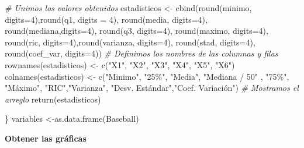 \documentclass{staprojteamusb}
\newenvironment{Shaded}{\begin{snugshade}}{\end{snugshade}}
\newcommand{\AttributeTok}[1]{\textcolor[rgb]{0.77,0.63,0.00}{#1}}
\newcommand{\CommentTok}[1]{\textcolor[rgb]{0.56,0.35,0.01}{\textit{#1}}}
\newcommand{\DecValTok}[1]{\textcolor[rgb]{0.00,0.00,0.81}{#1}}
\newcommand{\FunctionTok}[1]{\textcolor[rgb]{0.00,0.00,0.00}{#1}}
\newcommand{\NormalTok}[1]{#1}
\newcommand{\OtherTok}[1]{\textcolor[rgb]{0.56,0.35,0.01}{#1}}
\newcommand{\StringTok}[1]{\textcolor[rgb]{0.31,0.60,0.02}{#1}}
\begin{document}
\begin{Shaded}
\begin{Highlighting}[]
  \CommentTok{\# Unimos los valores obtenidos}
\NormalTok{  estadisticos }\OtherTok{\textless{}{-}} \FunctionTok{cbind}\NormalTok{(}\FunctionTok{round}\NormalTok{(minimo, }\AttributeTok{digits=}\DecValTok{4}\NormalTok{),}\FunctionTok{round}\NormalTok{(q1, }\AttributeTok{digits =} \DecValTok{4}\NormalTok{),}
                        \FunctionTok{round}\NormalTok{(media, }\AttributeTok{digits=}\DecValTok{4}\NormalTok{), }\FunctionTok{round}\NormalTok{(mediana,}\AttributeTok{digits=}\DecValTok{4}\NormalTok{),}
                        \FunctionTok{round}\NormalTok{(q3, }\AttributeTok{digits=}\DecValTok{4}\NormalTok{), }\FunctionTok{round}\NormalTok{(maximo, }\AttributeTok{digits=}\DecValTok{4}\NormalTok{),}
                        \FunctionTok{round}\NormalTok{(ric, }\AttributeTok{digits=}\DecValTok{4}\NormalTok{),}\FunctionTok{round}\NormalTok{(varianza, }\AttributeTok{digits=}\DecValTok{4}\NormalTok{), }
                        \FunctionTok{round}\NormalTok{(stad, }\AttributeTok{digits=}\DecValTok{4}\NormalTok{), }\FunctionTok{round}\NormalTok{(coef\_var, }\AttributeTok{digits=}\DecValTok{4}\NormalTok{))}
  \CommentTok{\# Definimos los nombres de las columnas y filas}
  \FunctionTok{rownames}\NormalTok{(estadisticos) }\OtherTok{\textless{}{-}} \FunctionTok{c}\NormalTok{(}\StringTok{"X1"}\NormalTok{, }\StringTok{"X2"}\NormalTok{, }\StringTok{"X3"}\NormalTok{, }\StringTok{"X4"}\NormalTok{, }\StringTok{"X5"}\NormalTok{, }\StringTok{"X6"}\NormalTok{) }
  \FunctionTok{colnames}\NormalTok{(estadisticos) }\OtherTok{\textless{}{-}} \FunctionTok{c}\NormalTok{(}\StringTok{"Minimo"}\NormalTok{, }\StringTok{"25\%"}\NormalTok{, }\StringTok{"Media"}\NormalTok{, }\StringTok{"Mediana / 50"}\NormalTok{ ,}
                              \StringTok{"75\%"}\NormalTok{, }\StringTok{"Máximo"}\NormalTok{, }\StringTok{"RIC"}\NormalTok{,}\StringTok{"Varianza"}\NormalTok{, }
                              \StringTok{"Desv. Estándar"}\NormalTok{,}\StringTok{"Coef. Variación"}\NormalTok{)}
  \CommentTok{\# Mostramos el arreglo}
  \FunctionTok{return}\NormalTok{(estadisticos)}
  
\NormalTok{\}}
\NormalTok{variables }\OtherTok{\textless{}{-}}\FunctionTok{as.data.frame}\NormalTok{(Baseball)}
\end{Highlighting}
\end{Shaded}

 \textbf{Obtener las gráficas}
\end{document}

